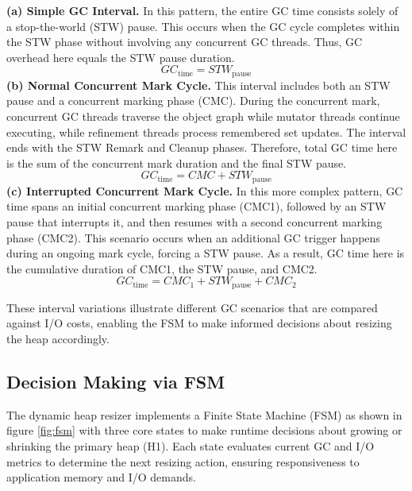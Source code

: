 \textbf{(a) Simple GC Interval.} In this pattern, the entire GC time consists solely of a stop-the-world (STW) pause. This occurs when the GC cycle completes within the STW phase without involving any concurrent GC threads. Thus, GC overhead here equals the STW pause duration. 
\begin{equation}
GC_{\text{time}} = STW_{\text{pause}}
\end{equation}
\textbf{(b) Normal Concurrent Mark Cycle.} This interval includes both an STW pause and a concurrent marking phase (CMC). During the concurrent mark, concurrent GC threads traverse the object graph while mutator threads continue executing, while refinement threads process remembered set updates. The interval ends with the STW Remark and Cleanup phases. Therefore, total GC time here is the sum of the concurrent mark duration and the final STW pause.
\begin{equation}
GC_{\text{time}} = CMC + STW_{\text{pause}}
\end{equation}
\textbf{(c) Interrupted Concurrent Mark Cycle.} In this more complex pattern, GC time spans an initial concurrent marking phase (CMC1), followed by an STW pause that interrupts it, and then resumes with a second concurrent marking phase (CMC2). This scenario occurs when an additional GC trigger happens during an ongoing mark cycle, forcing a STW pause. As a result, GC time here is the cumulative duration of CMC1, the STW pause, and CMC2.
\begin{equation}
  GC_{\text{time}} = CMC_{\text{1}} + STW_{\text{pause}} + CMC_{\text{2}}
\end{equation}

These interval variations illustrate different GC scenarios that are compared against I/O costs, enabling the FSM to make informed decisions about resizing the heap accordingly.

\subsection{Decision Making via FSM}

The dynamic heap resizer implements a Finite State Machine (FSM)  as shown in
figure \ref{fig:fsm} with three core states to make runtime decisions about
growing or shrinking the primary heap (H1). Each state evaluates current GC and
I/O metrics to determine the next resizing action, ensuring responsiveness to
application memory and I/O demands.

